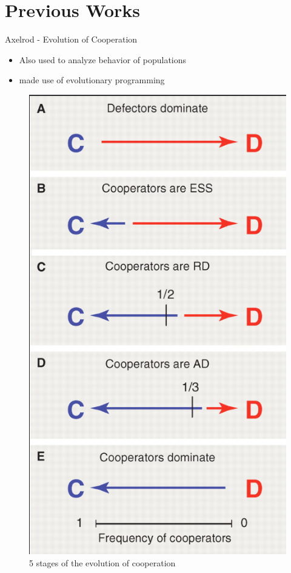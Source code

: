 \documentclass{IFES-beamer}
\begin{document}
\section{Previous Works}
    \begin{frame}{Axelrod - Evolution of Cooperation}
        \begin{itemize}
            \item Also used to analyze behavior of populations
            \item made use of evolutionary programming
        \end{itemize}
        \begin{figure}
            \centering
            \includegraphics[scale=0.25]{Images/evolution_coop.png}
            \caption{5 stages of the evolution of cooperation}
        \end{figure}
    \end{frame}
\end{document}
